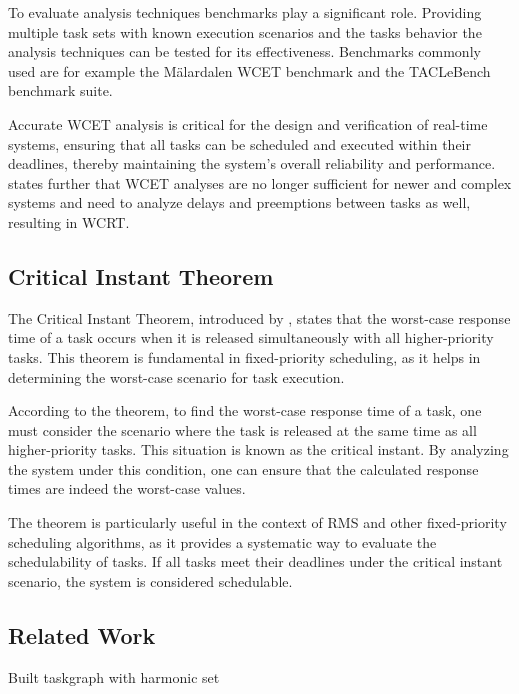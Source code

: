 To evaluate analysis techniques benchmarks play a significant role.
Providing multiple task sets with known execution scenarios and the tasks behavior the analysis techniques can be tested for its effectiveness. 
Benchmarks commonly used are for example the Mälardalen \ac{WCET} benchmark and the TACLeBench benchmark suite\cite{falkTACLeBenchBenchmarkCollection2016}.

Accurate \ac{WCET} analysis is critical for the design and verification of real-time systems, ensuring that all tasks can be scheduled and executed within their deadlines, thereby maintaining the system's overall reliability and performance\cite{kelterWCETAnalysisOptimization}.
\textcite{kelterWCETAnalysisOptimization} states further that \ac{WCET} analyses are no longer sufficient for newer and complex systems and need to analyze delays and preemptions between tasks as well, resulting in \ac{WCRT}.

\subsection{Critical Instant Theorem}
\label{sec:critial_instant_theorem}
The Critical Instant Theorem, introduced by \textcite{liuSchedulingAlgorithmsMultiprogramming1973}, states that the worst-case response time of a task occurs when it is released simultaneously with all higher-priority tasks.
This theorem is fundamental in fixed-priority scheduling, as it helps in determining the worst-case scenario for task execution.

According to the theorem, to find the worst-case response time of a task, one must consider the scenario where the task is released at the same time as all higher-priority tasks. 
This situation is known as the critical instant. By analyzing the system under this condition, one can ensure that the calculated response times are indeed the worst-case values.

The theorem is particularly useful in the context of \ac{RMS} and other fixed-priority scheduling algorithms, as it provides a systematic way to evaluate the schedulability of tasks. 
If all tasks meet their deadlines under the critical instant scenario, the system is considered schedulable.

\subsection{Related Work}
\label{sec:related_work}
\todo{}
\cite{dar-tzenpengAssignmentSchedulingCommunicating1997} Built taskgraph with harmonic set 